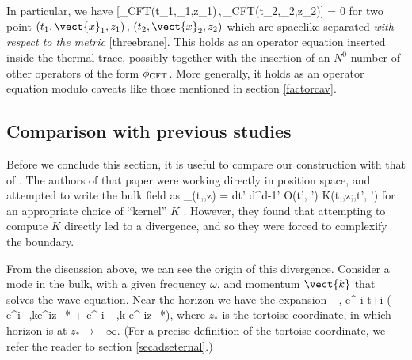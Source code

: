 In particular, we have
\be
\label{localityout}
 [\phi_{\rm CFT}(t_1,_1,z_1)\,,\,\phi_{\rm CFT}(t_2,_2,z_2)] = 0
\ee
for two point $(t_1,\vect{x}_1,z_1)\,,\,(t_2,\vect{x}_2,z_2)$ which are spacelike separated {\it with respect to the metric} \eqref{threebrane}. This holds as an operator equation 
inserted inside the thermal trace, possibly together with the insertion of an $N^0$ number of other operators of the form $\phi_{\rm CFT}$. More generally, it holds as an operator
equation modulo caveats like those mentioned in section \ref{factorcav}.


\subsection{Comparison with previous studies \label{comparelit}}
Before we conclude this section, it is useful to compare our construction with that of \cite{Hamilton:2005ju}. The authors of that paper were working directly in position space, and attempted to write the bulk field as
\be
\label{bhkernel}
\phi_{}(t,,z) = \int dt' d^{d-1}' {\cal O}(t', ') K(t,,z;,t', ')
\ee
for an appropriate choice of ``kernel'' $K$ . However, they found 
that attempting to compute $K$ directly led to a divergence, and so they were forced to complexify the boundary.

From the discussion above, we can see the origin of this divergence. Consider a mode in the bulk, with a given frequency $\omega$, and momentum $\vect{k}$ that solves the wave equation. Near the horizon we have the expansion
\be
\label{psinearh}                          
_{\omega,} \rightarrow e^{-i \omega t+i} \left( e^{i\delta_{\omega,k}}e^{i\omega z_*} + e^{-i \delta_{\omega,k}} e^{-i\omega z_*}\right),
\ee
where $z_*$ is the tortoise coordinate, in which horizon is at $z_*\rightarrow -\infty$. (For a precise definition of the tortoise coordinate, we refer the reader to section \ref{secadseternal}.) 

